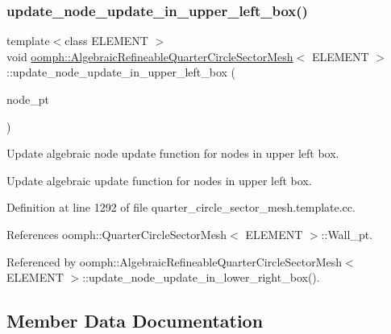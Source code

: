 \subsubsection{\texorpdfstring{update\+\_\+node\+\_\+update\+\_\+in\+\_\+upper\+\_\+left\+\_\+box()}{update\_node\_update\_in\_upper\_left\_box()}}
{\footnotesize\ttfamily template$<$class E\+L\+E\+M\+E\+NT $>$ \\
void \hyperlink{classoomph_1_1AlgebraicRefineableQuarterCircleSectorMesh}{oomph\+::\+Algebraic\+Refineable\+Quarter\+Circle\+Sector\+Mesh}$<$ E\+L\+E\+M\+E\+NT $>$\+::update\+\_\+node\+\_\+update\+\_\+in\+\_\+upper\+\_\+left\+\_\+box (\begin{DoxyParamCaption}\item[{Algebraic\+Node $\ast$\&}]{node\+\_\+pt }\end{DoxyParamCaption})\hspace{0.3cm}{\ttfamily [private]}}



Update algebraic node update function for nodes in upper left box. 

Update algebraic update function for nodes in upper left box. 

Definition at line 1292 of file quarter\+\_\+circle\+\_\+sector\+\_\+mesh.\+template.\+cc.



References oomph\+::\+Quarter\+Circle\+Sector\+Mesh$<$ E\+L\+E\+M\+E\+N\+T $>$\+::\+Wall\+\_\+pt.



Referenced by oomph\+::\+Algebraic\+Refineable\+Quarter\+Circle\+Sector\+Mesh$<$ E\+L\+E\+M\+E\+N\+T $>$\+::update\+\_\+node\+\_\+update\+\_\+in\+\_\+lower\+\_\+right\+\_\+box().



\subsection{Member Data Documentation}
\mbox{\label{classoomph_1_1AlgebraicRefineableQuarterCircleSectorMesh_aed38fed1e464c86e3dedd377e2459de7}} 
